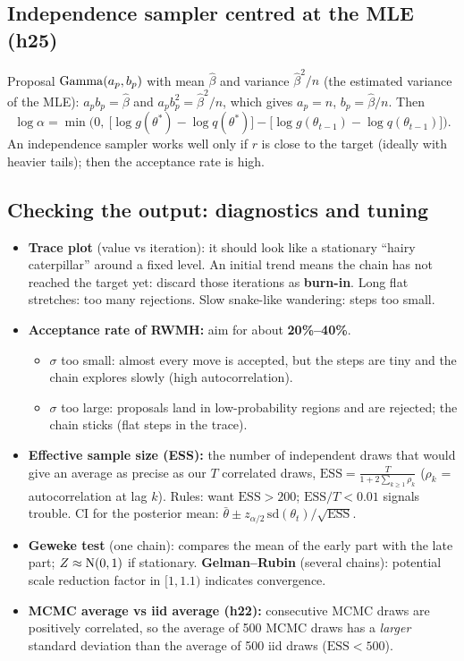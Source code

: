 \subsection{Independence sampler centred at the MLE (h25)}
Proposal $\mathrm{Gamma}(a_p,b_p)$ with mean $\hat\beta$ and variance $\hat\beta^2/n$ (the estimated variance of the MLE):
$a_pb_p = \hat\beta$ and $a_pb_p^2 = \hat\beta^2/n$, which gives $a_p = n$, $b_p = \hat\beta/n$. Then
\[
\log\alpha = \min\Big(0,\ \big[\log g(\theta^*)-\log q(\theta^*)\big]-\big[\log g(\theta_{t-1})-\log q(\theta_{t-1})\big]\Big).
\]
An independence sampler works well only if $r$ is close to the target (ideally with heavier tails); then the acceptance rate is high.

\subsection{Checking the output: diagnostics and tuning}
\begin{itemize}
  \item \textbf{Trace plot} (value vs iteration): it should look like a stationary ``hairy caterpillar'' around a fixed level. An initial trend means the chain has not reached the target yet: discard those iterations as \textbf{burn-in}. Long flat stretches: too many rejections. Slow snake-like wandering: steps too small.
  \item \textbf{Acceptance rate of RWMH:} aim for about \textbf{20\%--40\%}.
  \begin{itemize}
    \item $\sigma$ too small: almost every move is accepted, but the steps are tiny and the chain explores slowly (high autocorrelation).
    \item $\sigma$ too large: proposals land in low-probability regions and are rejected; the chain sticks (flat steps in the trace).
  \end{itemize}
  \item \textbf{Effective sample size (ESS):} the number of independent draws that would give an average as precise as our $T$ correlated draws, $\mathrm{ESS} = \frac{T}{1+2\sum_{k\ge1}\rho_k}$ ($\rho_k$ = autocorrelation at lag $k$). Rules: want $\mathrm{ESS}>200$; $\mathrm{ESS}/T<0.01$ signals trouble. CI for the posterior mean: $\bar\theta\pm z_{\alpha/2}\,\mathrm{sd}(\theta_t)/\sqrt{\mathrm{ESS}}$.
  \item \textbf{Geweke test} (one chain): compares the mean of the early part with the late part; $Z\approx\mathrm{N}(0,1)$ if stationary. \textbf{Gelman--Rubin} (several chains): potential scale reduction factor in $[1,1.1)$ indicates convergence.
  \item \textbf{MCMC average vs iid average (h22):} consecutive MCMC draws are positively correlated, so the average of 500 MCMC draws has a \emph{larger} standard deviation than the average of 500 iid draws ($\mathrm{ESS}<500$).
\end{itemize}

